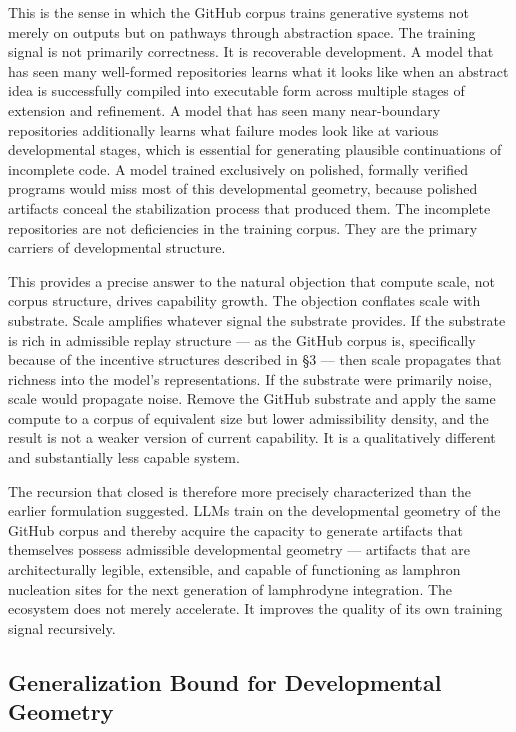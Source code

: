 \documentclass[11pt]{article}
\begin{document}
This is the sense in which the GitHub corpus trains generative systems not merely
on outputs but on pathways through abstraction space. The training signal is not
primarily correctness. It is recoverable development. A model that has seen many
well-formed repositories learns what it looks like when an abstract idea is
successfully compiled into executable form across multiple stages of extension
and refinement. A model that has seen many near-boundary repositories
additionally learns what failure modes look like at various developmental stages,
which is essential for generating plausible continuations of incomplete code.
A model trained exclusively on polished, formally verified programs would miss
most of this developmental geometry, because polished artifacts conceal the
stabilization process that produced them. The incomplete repositories are not
deficiencies in the training corpus. They are the primary carriers of
developmental structure.

This provides a precise answer to the natural objection that compute scale, not
corpus structure, drives capability growth. The objection conflates scale with
substrate. Scale amplifies whatever signal the substrate provides. If the
substrate is rich in admissible replay structure --- as the GitHub corpus is,
specifically because of the incentive structures described in \S3 --- then scale
propagates that richness into the model's representations. If the substrate were
primarily noise, scale would propagate noise. Remove the GitHub substrate and
apply the same compute to a corpus of equivalent size but lower admissibility
density, and the result is not a weaker version of current capability. It is a
qualitatively different and substantially less capable system.

The recursion that closed is therefore more precisely characterized than the
earlier formulation suggested. LLMs train on the developmental geometry of the
GitHub corpus and thereby acquire the capacity to generate artifacts that
themselves possess admissible developmental geometry --- artifacts that are
architecturally legible, extensible, and capable of functioning as lamphron
nucleation sites for the next generation of lamphrodyne integration. The
ecosystem does not merely accelerate. It improves the quality of its own
training signal recursively.

\subsection*{Generalization Bound for Developmental Geometry}
\end{document}
